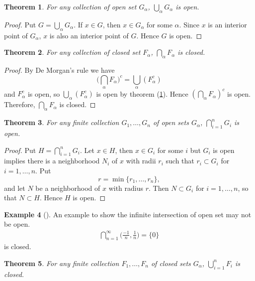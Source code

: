 \documentclass[	DIV=calc,paper=a4,fontsize=11pt]{scrartcl}	 	%
\newtheorem{thm}{Theorem}[section]
\theoremstyle{definition}
\newtheorem{exmp}[thm]{Example}
\theoremstyle{plain}
\theoremstyle{remark}
\begin{document}
\begin{thm}\label{arbitraryunion}
For any collection of open set $G_{\alpha}$, $\bigcup_{\alpha} G_{\alpha}$ is open.
\end{thm}
\begin{proof}
Put $G=\bigcup_{\alpha} G_{\alpha}$. If $x\in G$, then $x\in G_{\alpha}$ for some $\alpha$. Since $x$ is an interior point of $G_{\alpha}$, $x$ is also an interior point of $G$. Hence $G$ is open.
\end{proof}

\begin{thm}
For any collection of closed set $F_{\alpha}$, $\bigcap_{\alpha} F_{\alpha}$ is closed.
\end{thm}
\begin{proof}
By De Morgan's rule we have
\[\biggl(\bigcap_{\alpha} F_{\alpha}\biggl)^c=\bigcup_{\alpha}( F_{\alpha}^c)\]
and $F_{\alpha}^c$ is open, so $\bigcup_{\alpha}( F_{\alpha}^c)$ is open by theorem (\ref{arbitraryunion}). Hence $(\bigcap_{\alpha} F_{\alpha})^c$ is open. Therefore, $\bigcap_{\alpha} F_{\alpha}$ is closed.
\end{proof}

\begin{thm}\label{fios}
For any finite collection $G_1,\ldots,G_n$ of open sets $G_{\alpha}$, $\bigcap_{i=1}^n G_i$ is open.
\end{thm}
\begin{proof}
Put $H=\bigcap_{i=1}^n G_i$. Let $x\in H$, then $x\in G_i$ for some $i$ but $G_i$ is open implies there is a neighborhood $N_i$ of $x$ with radii $r_i$ such that $r_i\subset G_i$ for $i=1,\ldots,n$. Put
\[r=\min\{r_1,\ldots,r_n\},\]
and let $N$ be a neighborhood of $x$ with radius $r$. Then $N\subset G_i$ for $i=1,\ldots,n$, so that $N\subset H$. Hence $H$ is open.
\end{proof}

\begin{exmp}[]
An example to show the infinite intersection of open set may not be open.
\begin{align}
\bigcap_{n=1}^\infty \biggl( \frac{-1}{n},\frac{1}{n}\biggl)=\{0\}
\end{align}
is closed.
\end{exmp}

\begin{thm}
For any finite collection $F_1,\ldots,F_n$ of closed sets $G_{\alpha}$, $\bigcup_{i=1}^n F_i$ is closed.
\end{thm}
\end{document}
